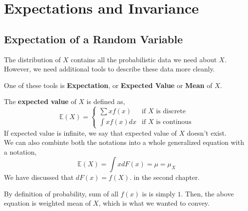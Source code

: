 \chapter{Expectations and Invariance}
\section{Expectation of a Random Variable}
The distribution of $X$ contains all the probabilistic data we need about $X$. However, we need additional tools to describe these data more cleanly. 
\par
One of these tools is \textbf{Expectation}, or \textbf{Expected Value} or \textbf{Mean} of $X$.
\begin{definition}
    The \textbf{expected value} of $X$ is defined as,
    \[\mathbb{E}(X)= \begin{cases}
        \sum xf(x)& \text{if $X$ is discrete} \\
        \int xf(x)dx &\text{if $X$ is continous}
    \end{cases}\]
    If expected value is infinite, we say that expected value of $X$ doesn't exist.\\
    We can also combinte both the notations into a whole generalized equation with a notation,
    \[\mathbb{E}(X) = \int x dF(x)= \mu = \mu_X\]
    We have discussed that $dF(x) = f(X)$. in the second chapter.
\end{definition}
By definition of probability, sum of all $f(x)$ is is simply $1$. Then, the above equation is weighted mean of $X$, which is what we wanted to convey.

